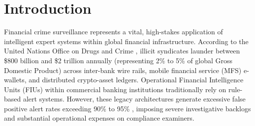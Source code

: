 \section{Introduction}
\label{sec:introduction}
Financial crime surveillance represents a vital, high-stakes application of intelligent expert systems within global financial infrastructure. According to the United Nations Office on Drugs and Crime \citep{unodc2011illicit}, illicit syndicates launder between \$800 billion and \$2 trillion annually (representing 2\% to 5\% of global Gross Domestic Product) across inter-bank wire rails, mobile financial service (MFS) e-wallets, and distributed crypto-asset ledgers. Operational Financial Intelligence Units (FIUs) within commercial banking institutions traditionally rely on rule-based alert systems. However, these legacy architectures generate excessive false positive alert rates exceeding 90\% to 95\% \citep{acams2020survey, fincen2019advisory}, imposing severe investigative backlogs and substantial operational expenses on compliance examiners.

